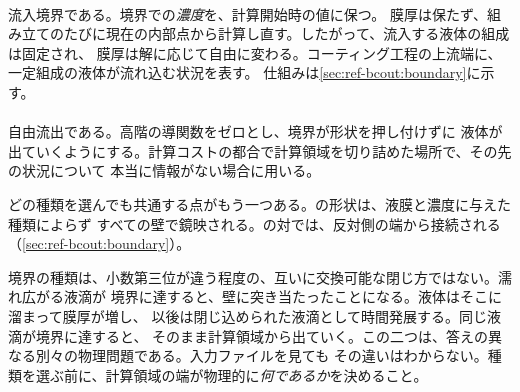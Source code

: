 \paragraph{} 流入境界である。境界での\emph{濃度}を、計算開始時の値に保つ。
膜厚は保たず、組み立てのたびに現在の内部点から計算し直す。したがって、流入する液体の組成は固定され、
膜厚は解に応じて自由に変わる。コーティング工程の上流端に、一定組成の液体が流れ込む状況を表す。
仕組みは\cref{sec:ref-bcout:boundary}に示す。

\paragraph{} 自由流出である。高階の導関数をゼロとし、境界が形状を押し付けずに
液体が出ていくようにする。計算コストの都合で計算領域を切り詰めた場所で、その先の状況について
本当に情報がない場合に用いる。

どの種類を選んでも共通する点がもう一つある。の形状は、液膜と濃度に与えた種類によらず
すべての壁で鏡映される。の対では、反対側の端から接続される
（\cref{sec:ref-bcout:boundary}）。

\begin{warn}[境界の種類は精度だけでなく結果そのものを変える]
  境界の種類は、小数第三位が違う程度の、互いに交換可能な閉じ方ではない。濡れ広がる液滴が
  境界に達すると、壁に突き当たったことになる。液体はそこに溜まって膜厚が増し、
  以後は閉じ込められた液滴として時間発展する。同じ液滴が境界に達すると、
  そのまま計算領域から出ていく。この二つは、答えの異なる別々の物理問題である。入力ファイルを見ても
  その違いはわからない。種類を選ぶ前に、計算領域の端が物理的に\emph{何であるか}を決めること。
\end{warn}
